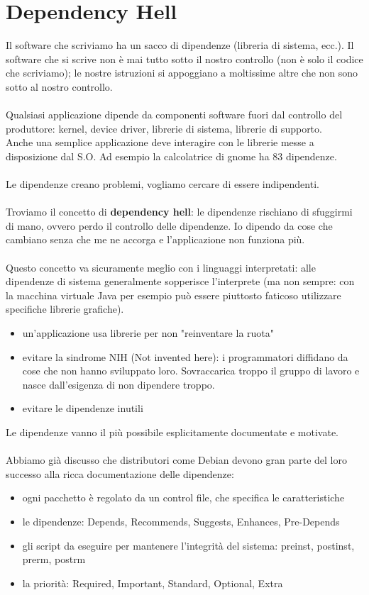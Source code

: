 \section{Dependency Hell}
Il software che scriviamo ha un sacco di dipendenze (libreria di sistema, ecc.). Il software che si scrive non è mai tutto sotto il nostro controllo (non è solo il codice che scriviamo); le nostre istruzioni si appoggiano a moltissime altre che non sono sotto al nostro controllo.
\\\\ Qualsiasi applicazione dipende da componenti software fuori dal controllo del produttore: kernel, device driver, librerie di sistema, librerie di supporto. 
\\ Anche una semplice applicazione deve interagire con le librerie messe a disposizione dal S.O.
Ad esempio la calcolatrice di gnome ha 83 dipendenze.
\\\\ Le dipendenze creano problemi, vogliamo cercare di essere indipendenti. 
\\\\ Troviamo il concetto di \textbf{dependency hell}: le dipendenze rischiano di sfuggirmi di mano, ovvero perdo il controllo delle dipendenze. Io dipendo da cose che cambiano senza che me ne accorga e l'applicazione non funziona più.
\\\\
Questo concetto va sicuramente meglio con i linguaggi interpretati: alle dipendenze di sistema generalmente sopperisce l’interprete (ma non sempre: con la macchina virtuale Java per esempio può essere piuttosto faticoso utilizzare specifiche librerie grafiche).
\begin{itemize}
    \item un'applicazione usa librerie per non "reinventare la ruota"
    \item evitare la sindrome NIH (Not invented here): i programmatori diffidano da cose che non hanno sviluppato loro. Sovraccarica troppo il gruppo di lavoro e nasce dall'esigenza di non dipendere troppo.
    \item evitare le dipendenze inutili
\end{itemize}
Le dipendenze vanno il più possibile esplicitamente documentate e motivate.
\\\\ 
Abbiamo già discusso che distributori come Debian devono gran parte del loro successo alla ricca documentazione delle dipendenze:
\begin{itemize}
    \item ogni pacchetto è regolato da un control file, che specifica le caratteristiche 
    \item le dipendenze: Depends, Recommends, Suggests, Enhances, Pre-Depends 
    \item gli script da eseguire per mantenere l’integrità del sistema: preinst, postinst, prerm, postrm
    \item la priorità: Required, Important, Standard, Optional, Extra
\end{itemize}
